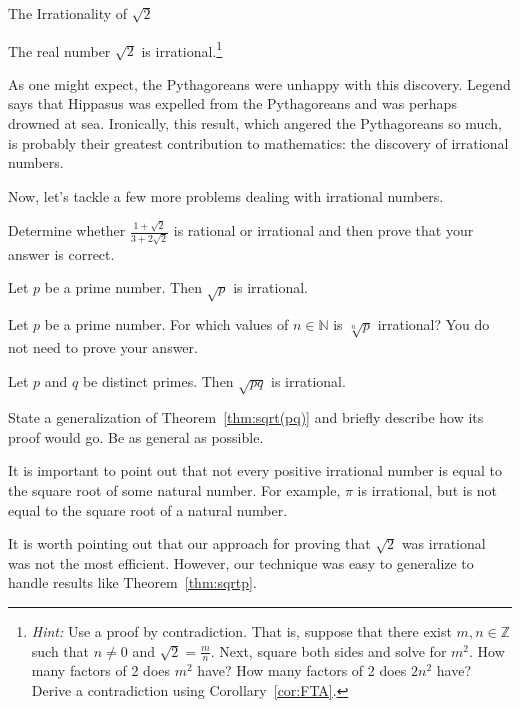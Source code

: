 \begin{section}{The Irrationality of $\sqrt{2}$}
\begin{theorem}
\label{thm:sqrt2}
The real number $\sqrt{2}$ is irrational.\footnote{\emph{Hint:} Use a proof by contradiction.  That is, suppose that there exist $m,n\in\mathbb{Z}$ such that $n\ne 0$ and $\sqrt{2}=\frac{m}{n}$. Next, square both sides and solve for $m^2$. How many factors of 2 does $m^2$ have?  How many factors of 2 does $2n^2$ have? Derive a contradiction using Corollary~\ref{cor:FTA}.}
\end{theorem}

As one might expect, the Pythagoreans were unhappy with this discovery. Legend says that Hippasus was expelled from the Pythagoreans and was perhaps drowned at sea. Ironically, this result, which angered the Pythagoreans so much, is probably their greatest contribution to mathematics: the discovery of irrational numbers.

Now, let's tackle a few more problems dealing with irrational numbers.

\begin{problem}
Determine whether $\displaystyle \frac{1+\sqrt{2}}{3+2\sqrt{2}}$ is rational or irrational and then prove that your answer is correct.
\end{problem}

\begin{theorem}\label{thm:sqrtp}
Let $p$ be a prime number.  Then $\sqrt{p}$ is irrational.
\end{theorem}

\begin{exercise}
Let $p$ be a prime number.  For which values of $n\in\mathbb{N}$ is $\sqrt[n]{p}$ irrational?  You do not need to prove your answer.
\end{exercise}

\begin{theorem}\label{thm:sqrt(pq)}
Let $p$ and $q$ be distinct primes.  Then $\sqrt{pq}$ is irrational.
\end{theorem}

\begin{problem}
State a generalization of Theorem~\ref{thm:sqrt(pq)} and briefly describe how its proof would go.  Be as general as possible.
\end{problem}

\begin{remark}
It is important to point out that not every positive irrational number is equal to the square root of some natural number.  For example, $\pi$ is irrational, but is not equal to the square root of a natural number.
\end{remark}

It is worth pointing out that our approach for proving that $\sqrt{2}$ was irrational was not the most efficient.  However, our technique was easy to generalize to handle results like Theorem~\ref{thm:sqrtp}.

\end{section}
